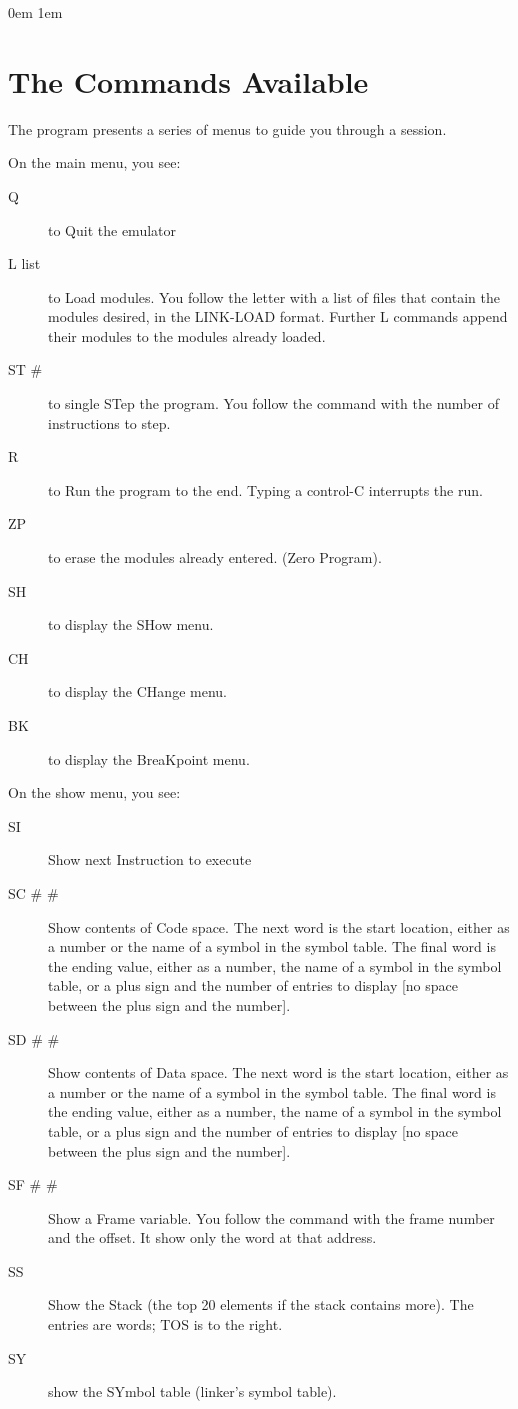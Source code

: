 \documentclass {report}
\author {M.~W.~Schulte}
\begin{document}
 \parindent 0em \parskip 1em
\section {The Commands Available}

The program presents a series of menus to guide you through
a session. 

On the main menu, you see:\begin {description}
\item[Q] to Quit the emulator
\item[L list] to Load modules.  You follow the letter with a list of files
that contain the modules desired, in the LINK-LOAD format.  Further L
commands append their modules to the modules already loaded.
\item[ST \#] to single STep the program.  You follow the command with the 
number of instructions to step.  
\item[R] to Run the program to the end.  Typing a control-C interrupts 
the run.
\item[ZP] to erase the modules already entered. (Zero Program).
\item[SH] to display the SHow menu.
\item[CH] to display the CHange menu.
\item[BK] to display the BreaKpoint menu.
\end {description}

On the show menu, you see:\begin {description}
\item[SI] Show next Instruction to execute
\item[SC \# \#] Show contents of Code space.  
The next word is the start location, either as a number or the name of 
a symbol in the symbol table.  The final word is the ending value, 
either as a number, the name of a symbol in the symbol table, or a 
plus sign and the number of entries to display 
[no space between the plus sign and the number].
\item[SD \# \#] Show contents of Data space.  
The next word is the start location, either as a number or the name of 
a symbol in the symbol table.  The final word is the ending value, 
either as a number, the name of a symbol in the symbol table, or a 
plus sign and the number of entries to display 
[no space between the plus sign and the number].
\item[SF \# \#] Show a Frame variable.  You follow the command with
the frame number and the offset.  It show only the word at that address.
\item[SS] Show the Stack (the top 20 elements if the stack contains more).  
The entries are words; TOS is to the right.
\item[SY] show the SYmbol table (linker's symbol table).
\end {description}
\end{document}
